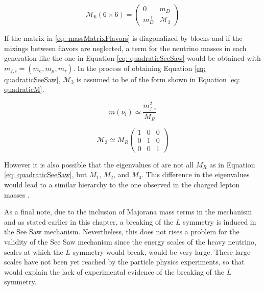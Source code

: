 \begin{equation}\label{eq: massMatrixFlavors}
\mathcal{M}_{6}(6\times 6) = \begin{pmatrix} 0&m_{D}\\m_{D}^{\intercal}&\mathcal{M_{\text{3}}} \end{pmatrix}
\end{equation}

If the matrix in \ref{eq: massMatrixFlavors} is diagonalized by blocks and if the mixings between flavors are neglected, a term for the neutrino masses in each generation like the one in Equation \ref{eq: quadraticSeeSaw} would be obtained with $m_{f,i} = (m_{e}, m_{\mu}, m_{\tau})$. In the process of obtaining Equation \ref{eq: quadraticSeeSaw}, $\mathcal{M_{\text{3}}}$ is assumed to be of the form shown in Equation \ref{eq: quadraticM}. 

\begin{equation}\label{eq: quadraticSeeSaw}
m(\nu_{i}) \simeq \frac{m_{f,i}^2}{M_{R}}
\end{equation}

\begin{equation}\label{eq: quadraticM}
\mathcal{M_{\text{3}}} \simeq M_{R} \begin{pmatrix} 1 & 0 & 0\\0 & 1 & 0 \\ 0 & 0 & 1 \end{pmatrix}
\end{equation}

However it is also possible that the eigenvalues of are not all $M_{R}$ as in Equation \ref{eq: quadraticSeeSaw}, but $M_{1}$, $M_{2}$, and $M_{3}$. This difference in the eigenvalues would lead to a similar hierarchy to the one observed in the charged lepton masses \cite{NeutrinoMass}. 

As a final note, due to the inclusion of Majorana mass terms in the mechanism and as stated earlier in this chapter, a breaking of the $L$ symmetry is induced in the See Saw mechanism. Nevertheless, this does not rises a problem for the validity of the See Saw mechanism since the energy scales of the heavy neutrino, scales at which the $L$ symmetry would break, would be very large. These large scales have not been yet reached by the particle physics experiments, so that would explain the lack of experimental evidence of the breaking of the $L$ symmetry.












 


